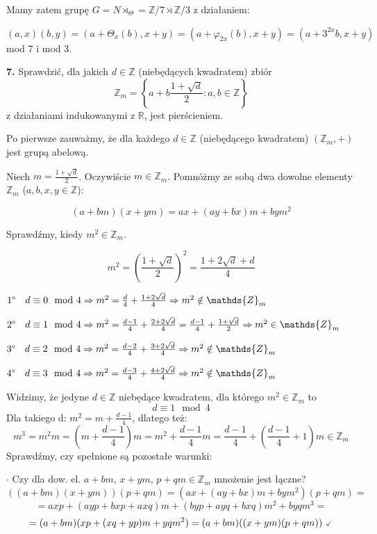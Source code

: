 \documentclass{article}
\begin{document}
Mamy zatem grupę $G=N\rtimes_\Theta=\mathds{Z}/7\rtimes\mathds{Z}/3$ z działaniem:
\begin{center}
$(a,x)(b,y)=(a+\Theta_x(b),x+y)=(a+\varphi_{2x}(b),x+y)=(a+3^{2x}b,x+y)$ mod 7 i mod 3.    
\end{center}

\begin{center}
\Large\textbf{7.} Sprawdzić, dla jakich $d\in\mathds{Z}$ (niebędących kwadratem) zbiór 
$$\mathds{Z}_{m}=\left\{a+b\frac{1+\sqrt{d}}{2}:a,b\in\mathds{Z}\right\}$$
z działaniami indukowanymi z $\mathds{R}$, jest pierścieniem.
\end{center}

Po pierwsze zauważmy, że dla każdego $d\in\mathds{Z}$ (niebędącego kwadratem) $(\mathds{Z}_m,+)$ jest grupą abelową. 

Niech $m=\frac{1+\sqrt{d}}{2}$. Oczywiście $m\in\mathds{Z}_m$. Pomnóżmy ze sobą dwa dowolne elementy $\mathds{Z}_m$ ($a,b,x,y\in\mathds{Z}$):

$$(a+bm)(x+ym)=ax+(ay+bx)m+bym^2$$

Sprawdźmy, kiedy $m^2\in\mathds{Z}_m$.

$$m^2=\left(\frac{1+\sqrt{d}}{2}\right)^2=\frac{1+2\sqrt{d}+d}{4}$$
\begin{flushleft}
$1\degree\quad d\equiv 0\mod4\Rightarrow m^2=\frac{d}{4}+\frac{1+2\sqrt{d}}{4}\Rightarrow m^2\notin\mathds{Z}_m$

$2\degree\quad d\equiv 1\mod4\Rightarrow m^2=\frac{d-1}{4}+\frac{2+2\sqrt{d}}{4}=\frac{d-1}{4}+\frac{1+\sqrt{d}}{2}\Rightarrow m^2\in\mathds{Z}_m$

$3\degree\quad d\equiv 2\mod4\Rightarrow m^2=\frac{d-2}{4}+\frac{3+2\sqrt{d}}{4}\Rightarrow m^2\notin\mathds{Z}_m$

$4\degree\quad d\equiv 3\mod4\Rightarrow m^2=\frac{d-3}{4}+\frac{4+2\sqrt{d}}{4}\Rightarrow m^2\notin\mathds{Z}_m$
\end{flushleft}

Widzimy, że jedyne $d\in\mathds{Z}$ niebędące kwadratem, dla którego $m^2\in\mathds{Z}_m$ to $$d\equiv1\mod4$$
Dla takiego d: $m^2=m+\frac{d-1}{4}$, dlatego też: $$m^3=m^2m=\left(m+\frac{d-1}{4}\right)m=m^2+\frac{d-1}{4}m=\frac{d-1}{4}+\left(\frac{d-1}{4}+1\right)m\in\mathds{Z}_m$$
Sprawdźmy, czy spełnione są pozostałe warunki:

$\cdot$ Czy dla dow. el. $a+bm$, $x+ym$, $p+qm\in\mathds{Z}_m$ mnożenie jest łączne?
$$((a+bm)(x+ym))(p+qm)=(ax+(ay+bx)m+bym^2)(p+qm)=$$
$$=axp+(ayp+bxp+axq)m+(byp+ayq+bxq)m^2+byqm^3=$$
$$=(a+bm)(xp+(xq+yp)m+yqm^2)=(a+bm)((x+ym)(p+qm))\ \checked$$
\end{document}

